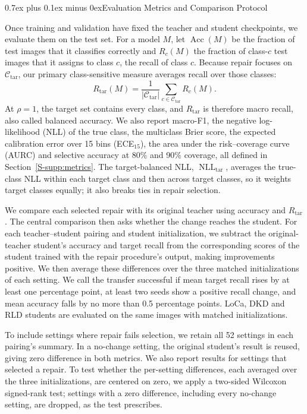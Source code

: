 \documentclass[10pt,journal,compsoc]{IEEEtran}
\makeatletter
\def\subsection{\@startsection{subsection}{2}{\z@}{-3.5ex plus -0.5ex minus -1.5ex}%
{0.7ex plus 0.1ex minus 0ex}{\normalfont\normalsize\sffamily\bfseries}}
\theoremstyle{definition}
\makeatother
\begin{document}
\vspace{-5pt}
\subsection{Evaluation Metrics and Comparison Protocol}
\label{sec:evaluation-metrics}

Once training and validation have fixed the teacher and student
checkpoints, we evaluate them on the test set. For a model $M$, let
$\operatorname{Acc}(M)$ be the fraction of test images that it classifies
correctly and $R_c(M)$ the fraction of class-$c$ test images that it
assigns to class $c$, the recall of class $c$. Because repair focuses on
$\mathcal C_{\mathrm{tar}}$, our primary class-sensitive measure averages
recall over those classes:
\begin{equation}
\label{eq:target-recall}
R_{\mathrm{tar}}(M)=\frac{1}{|\mathcal C_{\mathrm{tar}}|}
\sum_{c\in\mathcal C_{\mathrm{tar}}}R_c(M).
\end{equation}
At $\rho=1$, the target set contains every class, and
$R_{\mathrm{tar}}$ is therefore macro recall, also called balanced
accuracy. We also report
macro-F1, the negative log-likelihood (NLL) of the true class, the
multiclass Brier score, the expected calibration error over 15 bins
(ECE$_{15}$), the area under the risk--coverage curve (AURC) and
selective accuracy at 80\% and 90\% coverage, all defined in
Section~\ref{S-supp:metrics}. The target-balanced NLL,
$\operatorname{NLL}_{\mathrm{tar}}$, averages the true-class NLL within
each target class and then across target classes, so it weights target
classes equally; it also breaks ties in repair selection.

We compare each selected repair with its original teacher using
accuracy and $R_{\mathrm{tar}}$. The central comparison then asks
whether the change reaches the student. For each teacher--student
pairing and student initialization, we subtract the original-teacher
student's accuracy and target recall from the corresponding scores of
the student trained with the repair procedure's output, making
improvements positive. We then average these differences over the
three matched initializations of each setting. We call the transfer
successful if mean target recall rises by at least one percentage
point, at least two seeds show a positive recall change, and mean
accuracy falls by no more than 0.5 percentage points. LoCa, DKD and
RLD students are evaluated on the same images with matched
initializations.

To include settings where repair fails selection, we retain all 52
settings in each pairing's summary. In a no-change setting, the
original student's result is reused, giving zero difference in both
metrics. We also report results for settings that selected
a repair. To test whether the per-setting differences, each averaged
over the three initializations, are centered on zero, we apply a
two-sided Wilcoxon signed-rank test; settings with a zero difference,
including every no-change setting, are dropped, as the test prescribes.
\end{document}
